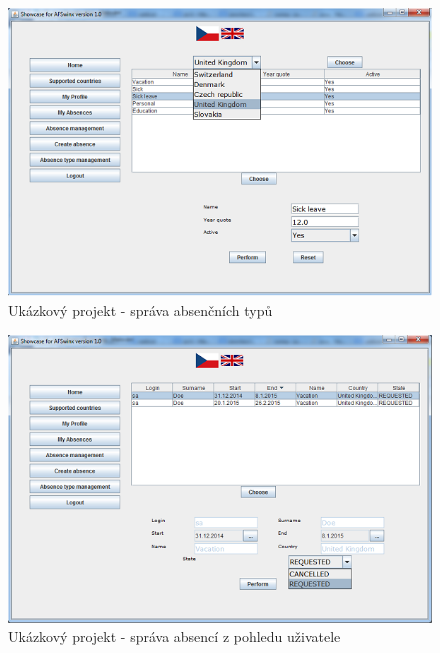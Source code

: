\documentclass[11pt,twoside,a4paper]{book}
\begin{document}
\begin{figure}
\includegraphics{images/AbsenceType}
\caption{Ukázkový projekt - správa absenčních typů}
\label{img:AbsenceType}
\end{figure}	

\begin{figure}
\includegraphics{images/AbsenceManagement}
\caption{Ukázkový projekt - správa absencí z pohledu uživatele}
\label{img:AbsenceManagement}
\end{figure}	
\end{document}
